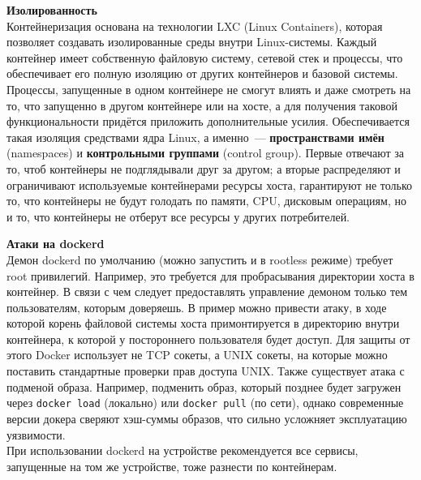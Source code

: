     \textbf{Изолированность} ~\\
	Контейнеризация основана на технологии LXC (Linux Containers), 
	которая позволяет создавать изолированные среды внутри Linux-системы. 
	Каждый контейнер имеет собственную файловую систему, сетевой стек 
	и процессы, что обеспечивает его полную изоляцию от других контейнеров 
	и базовой системы. Процессы, запущенные в одном контейнере не смогут влиять и даже смотреть на то, что запущенно в другом контейнере или на хосте, а для получения таковой функциональности придётся приложить дополнительные усилия. 
    Обеспечивается такая изоляция средствами ядра Linux, а именно~--- \textbf{пространствами имён} (namespaces) и \textbf{контрольными группами} (control group). Первые отвечают за то, чтоб контейнеры
    не подглядывали друг за другом; а вторые распределяют и ограничивают используемые контейнерами ресурсы хоста, гарантируют не только то, что контейнеры не будут голодать по памяти, CPU, дисковым операциям,
    но и то, что контейнеры не отберут все ресурсы у других потребителей.

    \textbf{Атаки на dockerd} ~\\
    Демон dockerd по умолчанию (можно запустить и в rootless режиме) требует root привилегий. Например, это требуется для пробрасывания директории хоста в контейнер. В связи с чем следует предоставлять
    управление демоном только тем пользователям, которым доверяешь. В пример можно привести атаку, в ходе которой корень файловой системы хоста примонтируется в директорию внутри контейнера, к которой
    у постороннего пользователя будет доступ. Для защиты от этого Docker использует не TCP сокеты, а UNIX сокеты, на которые можно поставить стандартные проверки прав доступа UNIX.
    Также существует атака с подменой образа. Например, подменить образ, который позднее будет загружен через \texttt{docker load} (локально) или \texttt{docker pull} (по сети), однако современные версии докера
    сверяют хэш-суммы образов, что сильно усложняет эксплуатацию уязвимости. \autocite{DockerSecurity} ~\\
    При использовании dockerd на устройстве рекомендуется все сервисы, запущенные на том же устройстве, тоже разнести по контейнерам.

